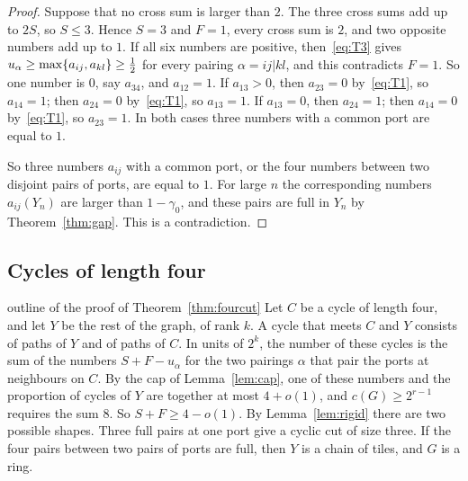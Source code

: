 \begin{proof}
Suppose that no cross sum is larger than $2$. The three cross sums add up to $2S$, so $S\le3$.
Hence $S=3$ and $F=1$, every cross sum is $2$, and two opposite numbers add up to $1$. If all six
numbers are positive, then~\eqref{eq:T3} gives $u_\alpha\ge\max\{a_{ij},a_{kl}\}\ge\tfrac12$ for
every pairing $\alpha=ij|kl$, and this contradicts $F=1$. So one number is $0$, say $a_{34}$, and
$a_{12}=1$. If $a_{13}>0$, then $a_{23}=0$ by~\eqref{eq:T1}, so $a_{14}=1$; then $a_{24}=0$
by~\eqref{eq:T1}, so $a_{13}=1$. If $a_{13}=0$, then $a_{24}=1$; then $a_{14}=0$
by~\eqref{eq:T1}, so $a_{23}=1$. In both cases three numbers with a common port are equal
to $1$.

 So three numbers $a_{ij}$ with a common port, or the four numbers between two
disjoint pairs of ports, are equal to $1$. For large $n$ the corresponding numbers
$a_{ij}(Y_n)$ are larger than $1-\gamma_0$, and these pairs are full in $Y_n$ by
Theorem~\ref{thm:gap}. This is a contradiction.
\end{proof}

\subsection{Cycles of length four}\label{sec:fourcycle}

\begin{idea}{outline of the proof of Theorem~\ref{thm:fourcut}}
Let $C$ be a cycle of length four, and let $Y$ be the rest of the graph, of rank $k$. A cycle
that meets $C$ and $Y$ consists of paths of $Y$ and of paths of $C$. In units of $2^{k}$, the
number of these cycles is the sum of the numbers $S+F-u_\alpha$ for the two pairings $\alpha$
that pair the ports at neighbours on $C$. By the cap of Lemma~\ref{lem:cap}, one of these
numbers and the proportion of cycles of $Y$ are together at most $4+o(1)$, and $c(G)\ge2^{r-1}$
requires the sum $8$. So $S+F\ge4-o(1)$. By Lemma~\ref{lem:rigid} there are two possible shapes.
Three full pairs at one port give a cyclic cut of size three. If the four pairs between two
pairs of ports are full, then $Y$ is a chain of tiles, and $G$ is a ring.
\end{idea}

